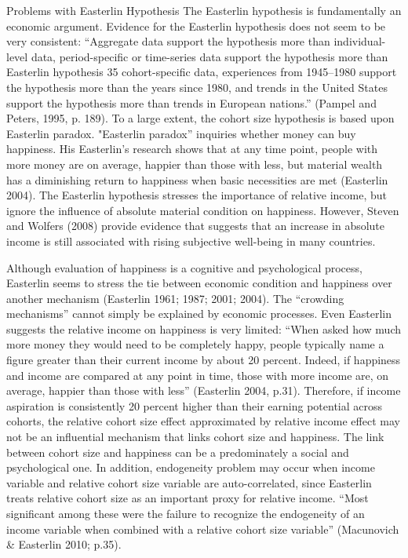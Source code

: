 Problems with Easterlin Hypothesis
The Easterlin hypothesis is fundamentally an economic argument. Evidence for the Easterlin hypothesis does not seem to be very consistent: “Aggregate data support the hypothesis more than individual-level data, period-specific or time-series data support the hypothesis more than Easterlin hypothesis 35 cohort-specific data, experiences from 1945–1980 support the hypothesis more than the years since 1980, and trends in the United States support the hypothesis more than trends in European nations.” (Pampel and Peters, 1995, p. 189). To a large extent, the cohort size hypothesis is based upon Easterlin paradox. "Easterlin paradox” inquiries whether money can buy happiness. His Easterlin’s research shows that at any time point, people with more money are on average, happier than those with less, but material wealth has a diminishing return to happiness when basic necessities are met (Easterlin 2004). The Easterlin hypothesis stresses the importance of relative income, but ignore the influence of absolute material condition on happiness. However, Steven and Wolfers (2008) provide evidence that suggests that an increase in absolute income is still associated with rising subjective well-being in many countries.

Although evaluation of happiness is a cognitive and psychological process, Easterlin seems to stress the tie between economic condition and happiness over another mechanism (Easterlin 1961; 1987; 2001; 2004). The “crowding mechanisms” cannot simply be explained by economic processes. Even Easterlin suggests the relative income on happiness is very limited: “When asked how much more money they would need to be completely happy, people typically name a figure greater than their current income by about 20 percent. Indeed, if happiness and income are compared at any point in time, those with more income are, on average, happier than those with less” (Easterlin 2004, p.31). Therefore, if income aspiration is consistently 20 percent higher than their earning potential across cohorts, the relative cohort size effect approximated by relative income effect may not be an influential mechanism that links cohort size and happiness. The link between cohort size and happiness can be a predominately a social and psychological one. In addition, endogeneity problem may occur when income variable and relative cohort size variable are auto-correlated, since Easterlin treats relative cohort size as an important proxy for relative income. “Most significant among these were the failure to recognize the endogeneity of an income variable when combined with a relative cohort size variable” (Macunovich & Easterlin 2010; p.35).

